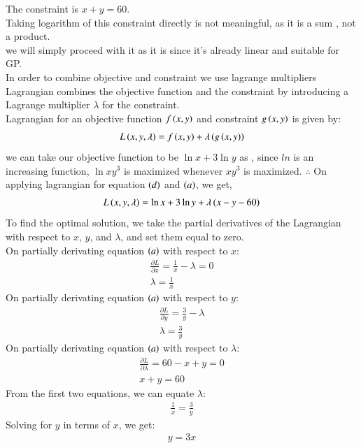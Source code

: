 \documentclass[journal]{IEEEtran}
\begin{document}
The constraint is $x + y = 60$.\\
Taking logarithm of this constraint directly is not meaningful, as it is a sum , not a product.\\
we will simply proceed with it as it is since it's already linear and suitable for GP.\\
In order to combine objective and constraint we use lagrange multipliers\\
Lagrangian combines the objective function and the constraint by introducing a Lagrange multiplier $\lambda$ for the constraint.\\
Lagrangian for an objective function $f\left(x,y\right)$ and constraint $g\left(x,y\right)$ is given by:
\begin{align}
    L\left(x,y,\lambda\right) = f\left(x,y\right) + \lambda\left(g\left(x,y\right)\right)
\end{align}
we can take our objective function to be $\ln{x} + 3\ln{y}$ as , since $ln$ is an increasing function, $\ln{xy^3}$ is maximized whenever $xy^3$ is maximized.
$\therefore$ On applying lagrangian for equation $\left(d\right)$ and $\left(a\right)$, we get,
\begin{align}
    L\left(x,y,\lambda\right) = \ln{x} + 3\ln{y} + \lambda\left(x - y - 60\right)
\end{align}
To find the optimal solution, we take the partial derivatives of the Lagrangian with respect to $x$, $y$, and $\lambda$, and set them equal to zero.\\

On partially derivating equation $\left(a\right)$ with respect to $x$:
\begin{align}
    \frac{\partial L}{\partial x} = \frac{1}{x} - \lambda = 0\\
    \lambda = \frac{1}{x}
\end{align}
On partially derivating equation $\left(a\right)$ with respect to $y$:
\begin{align}
    \frac{\partial L}{\partial y} = \frac{3}{y} - \lambda\\
    \lambda = \frac{3}{y}
\end{align}
On partially derivating equation $\left(a\right)$ with respect to $\lambda$:
\begin{align}
    \frac{\partial L}{\partial \lambda} = 60 - x + y = 0\\
    x + y = 60
\end{align}
From the first two equations, we can equate $\lambda$:
\begin{align}
    \frac{1}{x} = \frac{3}{y}
\end{align}
Solving for $y$ in terms of $x$, we get:
\begin{align}
    y = 3x
\end{align}
\end{document}

